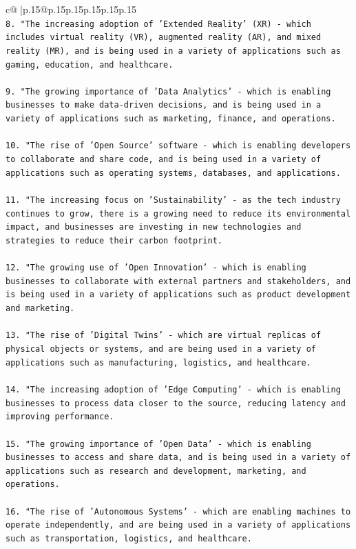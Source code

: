 \documentclass{article}
\begin{document}
{\begin{supertabular}{c@{$\;$}|p{.15\linewidth}@{}p{.15\linewidth}p{.15\linewidth}p{.15\linewidth}p{.15\linewidth}p{.15\linewidth}}
{{{\\ 
\texttt{8. "The increasing adoption of 'Extended Reality' (XR) {-} which includes virtual reality (VR), augmented reality (AR), and mixed reality (MR), and is being used in a variety of applications such as gaming, education, and healthcare.} \\
\\ 
\texttt{9. "The growing importance of 'Data Analytics' {-} which is enabling businesses to make data{-}driven decisions, and is being used in a variety of applications such as marketing, finance, and operations.} \\
\\ 
\texttt{10. "The rise of 'Open Source' software {-} which is enabling developers to collaborate and share code, and is being used in a variety of applications such as operating systems, databases, and applications.} \\
\\ 
\texttt{11. "The increasing focus on 'Sustainability' {-} as the tech industry continues to grow, there is a growing need to reduce its environmental impact, and businesses are investing in new technologies and strategies to reduce their carbon footprint.} \\
\\ 
\texttt{12. "The growing use of 'Open Innovation' {-} which is enabling businesses to collaborate with external partners and stakeholders, and is being used in a variety of applications such as product development and marketing.} \\
\\ 
\texttt{13. "The rise of 'Digital Twins' {-} which are virtual replicas of physical objects or systems, and are being used in a variety of applications such as manufacturing, logistics, and healthcare.} \\
\\ 
\texttt{14. "The increasing adoption of 'Edge Computing' {-} which is enabling businesses to process data closer to the source, reducing latency and improving performance.} \\
\\ 
\texttt{15. "The growing importance of 'Open Data' {-} which is enabling businesses to access and share data, and is being used in a variety of applications such as research and development, marketing, and operations.} \\
\\ 
\texttt{16. "The rise of 'Autonomous Systems' {-} which are enabling machines to operate independently, and are being used in a variety of applications such as transportation, logistics, and healthcare.} \\
}}}
\end{supertabular}}
\end{document}
